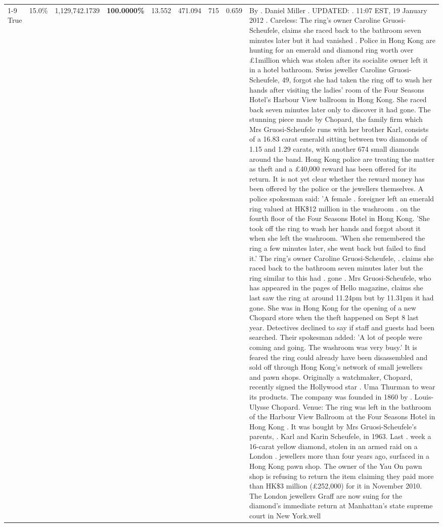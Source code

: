 \begin{table}[H]
\begin{tabular}{lllrlllll}
\cline{1-9}
True & 15.0\% & 1,129,742.1739 & \bfseries \color{red} 100.0000\% & 13.552 & 471.094 & 715 & 0.659 & By . Daniel Miller . UPDATED: . 11:07 EST, 19 January 2012 . Careless: The ring's owner Caroline Gruosi-Scheufele, claims she raced back to the bathroom seven minutes later but it had vanished . Police in Hong Kong are hunting for an emerald and diamond ring worth over £1million which was stolen after its socialite owner left it in a hotel bathroom. Swiss jeweller Caroline Gruosi-Scheufele, 49, forgot she had taken the ring off to wash her hands after visiting the ladies' room of the Four Seasons Hotel's Harbour View ballroom in Hong Kong. She raced back seven minutes later only to discover it had gone. The stunning piece made by Chopard, the family firm which Mrs Gruosi-Scheufele runs with her brother Karl, consists of a 16.83 carat emerald sitting between two diamonds of 1.15 and 1.29 carats, with another 674 small diamonds around the band. Hong Kong police are treating the matter as theft and a £40,000 reward has been offered for its return. It is not yet clear whether the reward money has been offered by the police or the jewellers themselves. A police spokesman said: 'A female . foreigner left an emerald ring valued at HK\$12 million in the washroom . on the fourth floor of the Four Seasons Hotel in Hong Kong. 'She took off the ring to wash her hands and forgot about it when she left the washroom. 'When she remembered the ring a few minutes later, she went back but failed to find it.' The ring's owner Caroline Gruosi-Scheufele, . claims she raced back to the bathroom seven minutes later but the ring similar to this had . gone . Mrs Gruosi-Scheufele, who has appeared in the pages of Hello magazine, claims she last saw the ring at around 11.24pm but by 11.31pm it had gone. She was in Hong Kong for the opening of a new Chopard store when the theft happened on Sept 8 last year. Detectives declined to say if staff and guests had been searched. Their spokesman added: 'A lot of people were coming and going. The washroom was very busy.' It is feared the ring could already have been disassembled and sold off through Hong Kong's network of small jewellers and pawn shops. Originally a watchmaker, Chopard, recently signed the Hollywood star . Uma Thurman to wear its products. The company was founded in 1860 by . Louis-Ulysse Chopard. Venue: The ring was left in the bathroom of the Harbour View Ballroom at the Four Seasons Hotel in Hong Kong . It was bought by Mrs Gruosi-Scheufele's  parents, . Karl and Karin Scheufele, in 1963. Last . week a 16-carat yellow diamond, stolen in an armed raid on a London . jewellers more than four years ago, surfaced in a Hong Kong pawn shop. The owner of the Yau On pawn shop is refusing to return the item claiming they paid more than HK\$3 million (£252,000) for it in November 2010. The London jewellers Graff are now suing for the diamond’s immediate return at Manhattan’s state supreme court in New York.well \\

\end{tabular}
\end{table}
